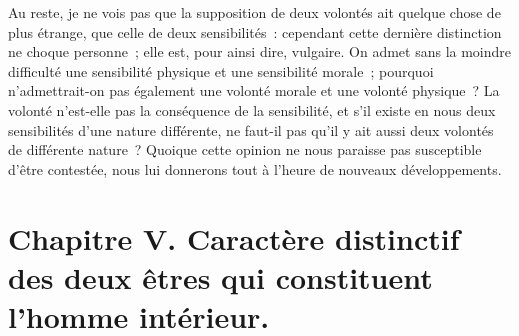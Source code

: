 \documentclass[french,twoside]{book} %
\newcommand\chapteropen{} %
\newcommand\chapterclose{} %
\begin{document}
Au reste, je ne vois pas que la supposition de deux volontés ait quelque chose de plus étrange, que celle de deux sensibilités : cependant cette dernière distinction ne choque personne ; elle est, pour ainsi dire, vulgaire. On admet sans la moindre difficulté une sensibilité physique et une sensibilité morale ; pourquoi n’admettrait-on pas également une volonté morale et une volonté physique ? La volonté n’est-elle pas la conséquence de la sensibilité, et s’il existe en nous deux sensibilités d’une nature différente, ne faut-il pas qu’il y ait aussi deux volontés de différente nature ? Quoique cette opinion ne nous paraisse pas susceptible d’être contestée, nous lui donnerons tout à l’heure de nouveaux développements.
\chapterclose


\chapteropen
\chapter[{Chapitre V. Caractère distinctif des deux êtres qui constituent l’homme intérieur.}]{Chapitre V. Caractère distinctif des deux êtres qui constituent l’homme intérieur.}\renewcommand{\leftmark}{Chapitre V. Caractère distinctif des deux êtres qui constituent l’homme intérieur.}
\end{document}
